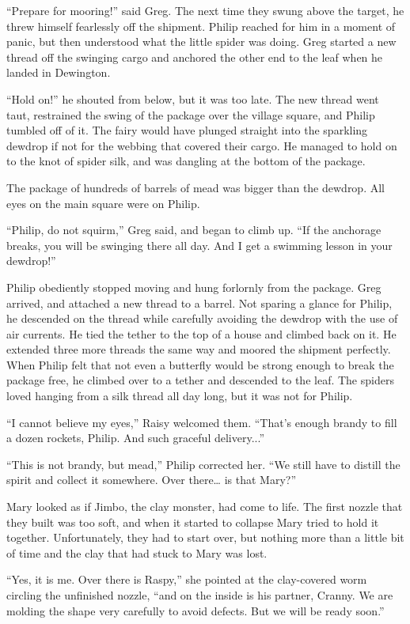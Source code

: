 \documentclass[10pt, draft]{memoir}
\begin{document}
``Prepare for mooring!'' said Greg. The next time they swung above the target, he threw himself fearlessly off the shipment. Philip reached for him in a moment of panic, but then understood what the little spider was doing. Greg started a new thread off the swinging cargo and anchored the other end to the leaf when he landed in Dewington.

``Hold on!'' he shouted from below, but it was too late. The new thread went taut, restrained the swing of the package over the village square, and Philip tumbled off of it. The fairy would have plunged straight into the sparkling dewdrop if not for the webbing that covered their cargo. He managed to hold on to the knot of spider silk, and was dangling at the bottom of the package.

The package of hundreds of barrels of mead was bigger than the dewdrop. All eyes on the main square were on Philip.

``Philip, do not squirm,'' Greg said, and began to climb up. ``If the anchorage breaks, you will be swinging there all day. And I get a swimming lesson in your dewdrop!''

Philip obediently stopped moving and hung forlornly from the package. Greg arrived, and attached a new thread to a barrel. Not sparing a glance for Philip, he descended on the thread while carefully avoiding the dewdrop with the use of air currents. He tied the tether to the top of a house and climbed back on it. He extended three more threads the same way and moored the shipment perfectly. When Philip felt that not even a butterfly would be strong enough to break the package free, he climbed over to a tether and descended to the leaf. The spiders loved hanging from a silk thread all day long, but it was not for Philip.

``I cannot believe my eyes,'' Raisy welcomed them. ``That's enough brandy to fill a dozen rockets, Philip. And such graceful delivery...''

``This is not brandy, but mead,'' Philip corrected her. ``We still have to distill the spirit and collect it somewhere. Over there… is that Mary?''

Mary looked as if Jimbo, the clay monster, had come to life. The first nozzle that they built was too soft, and when it started to collapse Mary tried to hold it together. Unfortunately, they had to start over, but nothing more than a little bit of time and the clay that had stuck to Mary was lost.

``Yes, it is me. Over there is Raspy,'' she pointed at the clay-covered worm circling the unfinished nozzle, ``and on the inside is his partner, Cranny. We are molding the shape very carefully to avoid defects. But we will be ready soon.''
\end{document}
